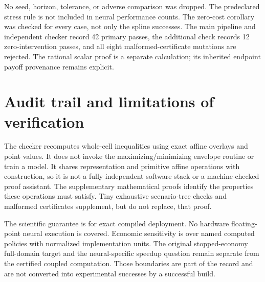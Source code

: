 No seed, horizon, tolerance, or adverse comparison was dropped. The predeclared stress rule is not included in neural performance counts. The zero-cost corollary was checked for every case, not only the spline successes. The main pipeline and independent checker record 42 primary passes, the additional check records 12 zero-intervention passes, and all eight malformed-certificate mutations are rejected. The rational scalar proof is a separate calculation; its inherited endpoint payoff provenance remains explicit.

\section{Audit trail and limitations of verification}
The checker recomputes whole-cell inequalities using exact affine overlays and point values. It does not invoke the maximizing/minimizing envelope routine or train a model. It shares representation and primitive affine operations with construction, so it is not a fully independent software stack or a machine-checked proof assistant. The supplementary mathematical proofs identify the properties these operations must satisfy. Tiny exhaustive scenario-tree checks and malformed certificates supplement, but do not replace, that proof.

The scientific guarantee is for exact compiled deployment. No hardware floating-point neural execution is covered. Economic sensitivity is over named computed policies with normalized implementation units. The original stopped-economy full-domain target and the neural-specific speedup question remain separate from the certified coupled computation. Those boundaries are part of the record and are not converted into experimental successes by a successful build.
